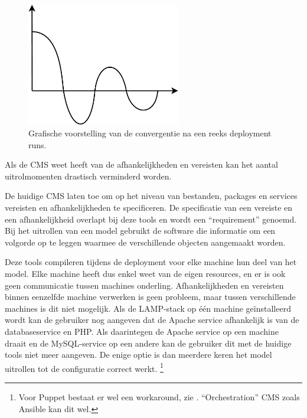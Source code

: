 \begin{figure}
    \begin{center}
    \includegraphics[width=0.6\textwidth]{images/convergentie.pdf}
    \caption{Grafische voorstelling van de convergentie na een reeks deployment runs.}
    \label{fig:convergentie}
    \end{center}
\end{figure}

Als de CMS weet heeft van de afhankelijkheden en vereisten kan het aantal uitrolmomenten drastisch verminderd worden.

De huidige CMS laten toe om op het niveau van bestanden, packages en services vereisten en afhankelijkheden te specificeren.
De specificatie van een vereiste en een afhankelijkheid overlapt bij deze tools en wordt een ``requirement'' genoemd.
Bij het uitrollen van een model gebruikt de software die informatie om een volgorde op te leggen waarmee de verschillende objecten aangemaakt worden.

Deze tools compileren tijdens de deployment voor elke machine hun deel van het model.
Elke machine heeft dus enkel weet van de eigen resources, en er is ook geen communicatie tussen machines onderling.
Afhankelijkheden en vereisten binnen eenzelfde machine verwerken is geen probleem, maar tussen verschillende machines is dit niet mogelijk.
Als de LAMP-stack op \'e\'en machine ge\"installeerd wordt kan de gebruiker nog aangeven dat de Apache service afhankelijk is van de databaseservice en PHP.
Als daarintegen de Apache service op een machine draait en de MySQL-service op een andere kan de gebruiker dit met de huidige tools niet meer aangeven.
De enige optie is dan meerdere keren het model uitrollen tot de configuratie correct werkt.
\footnote{Voor Puppet bestaat er wel een workaround, zie \cite{puppet-orchestration}. ``Orchestration'' CMS zoals Ansible\cite{ansible} kan dit wel. }

